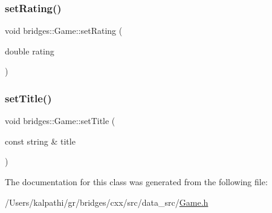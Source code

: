 \subsubsection{\texorpdfstring{setRating()}{setRating()}}
{\footnotesize\ttfamily void bridges\+::\+Game\+::set\+Rating (\begin{DoxyParamCaption}\item[{double}]{rating }\end{DoxyParamCaption})\hspace{0.3cm}{\ttfamily [inline]}}

\mbox{\label{classbridges_1_1_game_af5c88115cd037f6d5853fdf1ff79f3a3}} 
\subsubsection{\texorpdfstring{setTitle()}{setTitle()}}
{\footnotesize\ttfamily void bridges\+::\+Game\+::set\+Title (\begin{DoxyParamCaption}\item[{const string \&}]{title }\end{DoxyParamCaption})\hspace{0.3cm}{\ttfamily [inline]}}



The documentation for this class was generated from the following file\+:\begin{DoxyCompactItemize}
\item 
/\+Users/kalpathi/gr/bridges/cxx/src/data\+\_\+src/\mbox{\hyperlink{_game_8h}{Game.\+h}}\end{DoxyCompactItemize}
